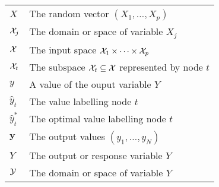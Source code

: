 \begin{tabularx}{\textwidth}{ l X }
$X$ & The random vector $(X_1,\dots,X_p)$ \dotfill  \pageref{ntn:vector-X}\\
${\cal X}_j$ & The domain or space of variable $X_j$ \dotfill  \pageref{ntn:space-X_j}\\
${\cal X}$ & The input space ${\cal X}_1 \times \dots \times {\cal X}_p$ \dotfill  \pageref{ntn:space-X}\\
${\cal X}_t$ & The subspace ${\cal X}_t \subseteq {\cal X}$ represented by node $t$ \dotfill  \pageref{ntn:node-space}\\
$y$ & A value of the ouput variable $Y$ \dotfill  \pageref{ntn:value-y}\\
$\widehat{y}_t$ & The value labelling node $t$ \dotfill  \pageref{ntn:y_t}\\
$\widehat{y}_t^*$ & The optimal value labelling node $t$ \dotfill  \pageref{ntn:y_t-star}\\
$\mathbf{y}$ & The output values $(y_1,\dots,y_N)$ \dotfill  \pageref{ntn:vector-y}\\
$Y$ & The output or response variable $Y$ \dotfill  \pageref{ntn:var-Y}\\
${\cal Y}$ & The domain or space of variable $Y$ \dotfill  \pageref{ntn:space-Y}\\
\end{tabularx}
